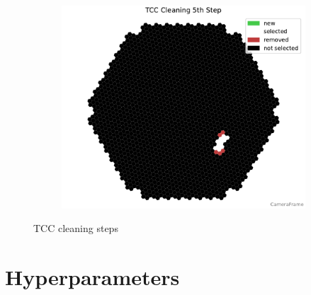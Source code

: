 \begin{figure}
\begin{subfigure}[]{0.32\textwidth}
        \includegraphics[width=\textwidth]{plots/cleaner_steps/tcc_5.pdf}
    \end{subfigure}
    \caption{TCC cleaning steps}
    \label{fig:tcc_cleaning}
\end{figure}

\section{Hyperparameters}
\label{sec:hyperparameters}

